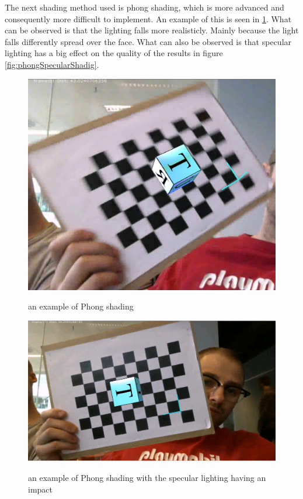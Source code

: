 The next shading method used is phong shading, which is more advanced and consequently 
more difficult to implement. An example of this is seen in \ref{fig:phongShading}. 
What can be observed is that the lighting falls more realisticly. Mainly because the light falls 
differently spread over the face. What can also be observed is that specular lighting has
a big effect on the quality of the results in figure \ref{fig:phongSpecularShadig}.
\begin{figure}[!htbp]
    \includegraphics{pics/phongShading.png}
    \label{fig:phongShading}
    \caption{an example of Phong shading}
\end{figure}

\begin{figure}[!htbp]
    \includegraphics{pics/phongSpecularShading.png}
    \label{fig:phongSpecularShading}
    \caption{an example of Phong shading with the specular lighting having an impact}
\end{figure}
